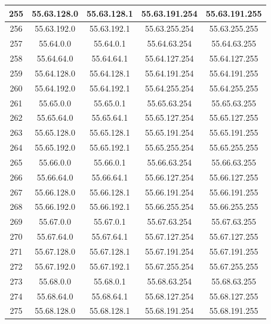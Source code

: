 \documentclass[letterpaper,12pt]{article}
\begin{document}
\begin{center}
\begin{longtable}{|c|c|c|c|c|}
                255 & 55.63.128.0 & 55.63.128.1 & 55.63.191.254 & 55.63.191.255 \\ \hline
                256 & 55.63.192.0 & 55.63.192.1 & 55.63.255.254 & 55.63.255.255 \\ \hline
                257 & 55.64.0.0 & 55.64.0.1 & 55.64.63.254 & 55.64.63.255 \\ \hline
                258 & 55.64.64.0 & 55.64.64.1 & 55.64.127.254 & 55.64.127.255 \\ \hline
                259 & 55.64.128.0 & 55.64.128.1 & 55.64.191.254 & 55.64.191.255 \\ \hline
                260 & 55.64.192.0 & 55.64.192.1 & 55.64.255.254 & 55.64.255.255 \\ \hline
                261 & 55.65.0.0 & 55.65.0.1 & 55.65.63.254 & 55.65.63.255 \\ \hline
                262 & 55.65.64.0 & 55.65.64.1 & 55.65.127.254 & 55.65.127.255 \\ \hline
                263 & 55.65.128.0 & 55.65.128.1 & 55.65.191.254 & 55.65.191.255 \\ \hline
                264 & 55.65.192.0 & 55.65.192.1 & 55.65.255.254 & 55.65.255.255 \\ \hline
                265 & 55.66.0.0 & 55.66.0.1 & 55.66.63.254 & 55.66.63.255 \\ \hline
                266 & 55.66.64.0 & 55.66.64.1 & 55.66.127.254 & 55.66.127.255 \\ \hline
                267 & 55.66.128.0 & 55.66.128.1 & 55.66.191.254 & 55.66.191.255 \\ \hline
                268 & 55.66.192.0 & 55.66.192.1 & 55.66.255.254 & 55.66.255.255 \\ \hline
                269 & 55.67.0.0 & 55.67.0.1 & 55.67.63.254 & 55.67.63.255 \\ \hline
                270 & 55.67.64.0 & 55.67.64.1 & 55.67.127.254 & 55.67.127.255 \\ \hline
                271 & 55.67.128.0 & 55.67.128.1 & 55.67.191.254 & 55.67.191.255 \\ \hline
                272 & 55.67.192.0 & 55.67.192.1 & 55.67.255.254 & 55.67.255.255 \\ \hline
                273 & 55.68.0.0 & 55.68.0.1 & 55.68.63.254 & 55.68.63.255 \\ \hline
                274 & 55.68.64.0 & 55.68.64.1 & 55.68.127.254 & 55.68.127.255 \\ \hline
                275 & 55.68.128.0 & 55.68.128.1 & 55.68.191.254 & 55.68.191.255 \\ \hline

\end{longtable}
\end{center}
\end{document}
